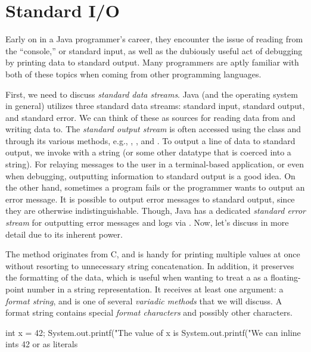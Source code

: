 \section{Standard I/O}
Early on in a Java programmer's career, they encounter the issue of reading from the ``console,'' or standard input, as well as the dubiously useful act of debugging by printing data to standard output. 
Many programmers are aptly familiar with both of these topics when coming from other programming languages.

First, we need to discuss \emph{standard data streams}. Java (and the operating system in general) utilizes three standard data streams: standard input, standard output, and standard error. 
We can think of these as sources for reading data from and writing data to. 
The \emph{standard output stream} is often accessed using the  class and through its various methods, e.g., , , and . 
To output a line of data to standard output, we invoke  with a string (or some other datatype that is coerced into a string). 
For relaying messages to the user in a terminal-based application, or even when debugging, outputting information to standard output is a good idea. 
On the other hand, sometimes a program fails or the programmer wants to output an error message. 
It is possible to output error messages to standard output, since they are otherwise indistinguishable. 
Though, Java has a dedicated \emph{standard error stream} for outputting error messages and logs via . 
Now, let's discuss  in more detail due to its inherent power.

The  method originates from C, and is handy for printing multiple values at once without resorting to unnecessary string concatenation. 
In addition, it preserves the formatting of the data, which is useful when wanting to treat a  as a floating-point number in a string representation. 
It receives at least one argument: a \emph{format string}, and is one of several \emph{variadic methods} that we will discuss. A format string contains special \emph{format characters} and possibly other characters. 

\begin{verbnobox}[\small]
int x = 42;
System.out.printf("The value of x is %
System.out.printf("We can inline ints 42 or as literals %
\end{verbnobox}


